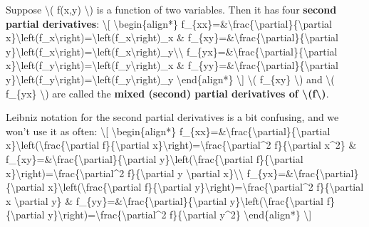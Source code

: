 Suppose \textbackslash{}( f(x,y) \textbackslash{}) is a function of two
variables. Then it has four \textbf{second partial derivatives}:
\textbackslash{}{[} \textbackslash{}begin\{align*\}
f\_\{xx\}=\&\textbackslash{}frac\{\textbackslash{}partial\}\{\textbackslash{}partial
x\}\textbackslash{}left(f\_x\textbackslash{}right)=\textbackslash{}left(f\_x\textbackslash{}right)\_x
\&
f\_\{xy\}=\&\textbackslash{}frac\{\textbackslash{}partial\}\{\textbackslash{}partial
y\}\textbackslash{}left(f\_x\textbackslash{}right)=\textbackslash{}left(f\_x\textbackslash{}right)\_y\textbackslash{}\textbackslash{}
f\_\{yx\}=\&\textbackslash{}frac\{\textbackslash{}partial\}\{\textbackslash{}partial
x\}\textbackslash{}left(f\_y\textbackslash{}right)=\textbackslash{}left(f\_y\textbackslash{}right)\_x
\&
f\_\{yy\}=\&\textbackslash{}frac\{\textbackslash{}partial\}\{\textbackslash{}partial
y\}\textbackslash{}left(f\_y\textbackslash{}right)=\textbackslash{}left(f\_y\textbackslash{}right)\_y
\textbackslash{}end\{align*\} \textbackslash{}{]} \textbackslash{}(
f\_\{xy\} \textbackslash{}) and \textbackslash{}( f\_\{yx\}
\textbackslash{}) are called the \textbf{mixed (second) partial
derivatives of \textbackslash{}(f\textbackslash{})}.

Leibniz notation for the second partial derivatives is a bit confusing,
and we won't use it as often: \textbackslash{}{[}
\textbackslash{}begin\{align*\}
f\_\{xx\}=\&\textbackslash{}frac\{\textbackslash{}partial\}\{\textbackslash{}partial
x\}\textbackslash{}left(\textbackslash{}frac\{\textbackslash{}partial
f\}\{\textbackslash{}partial
x\}\textbackslash{}right)=\textbackslash{}frac\{\textbackslash{}partial\^{}2
f\}\{\textbackslash{}partial x\^{}2\} \&
f\_\{xy\}=\&\textbackslash{}frac\{\textbackslash{}partial\}\{\textbackslash{}partial
y\}\textbackslash{}left(\textbackslash{}frac\{\textbackslash{}partial
f\}\{\textbackslash{}partial
x\}\textbackslash{}right)=\textbackslash{}frac\{\textbackslash{}partial\^{}2
f\}\{\textbackslash{}partial y \textbackslash{}partial
x\}\textbackslash{}\textbackslash{}
f\_\{yx\}=\&\textbackslash{}frac\{\textbackslash{}partial\}\{\textbackslash{}partial
x\}\textbackslash{}left(\textbackslash{}frac\{\textbackslash{}partial
f\}\{\textbackslash{}partial
y\}\textbackslash{}right)=\textbackslash{}frac\{\textbackslash{}partial\^{}2
f\}\{\textbackslash{}partial x \textbackslash{}partial y\} \&
f\_\{yy\}=\&\textbackslash{}frac\{\textbackslash{}partial\}\{\textbackslash{}partial
y\}\textbackslash{}left(\textbackslash{}frac\{\textbackslash{}partial
f\}\{\textbackslash{}partial
y\}\textbackslash{}right)=\textbackslash{}frac\{\textbackslash{}partial\^{}2
f\}\{\textbackslash{}partial y\^{}2\} \textbackslash{}end\{align*\}
\textbackslash{}{]}

